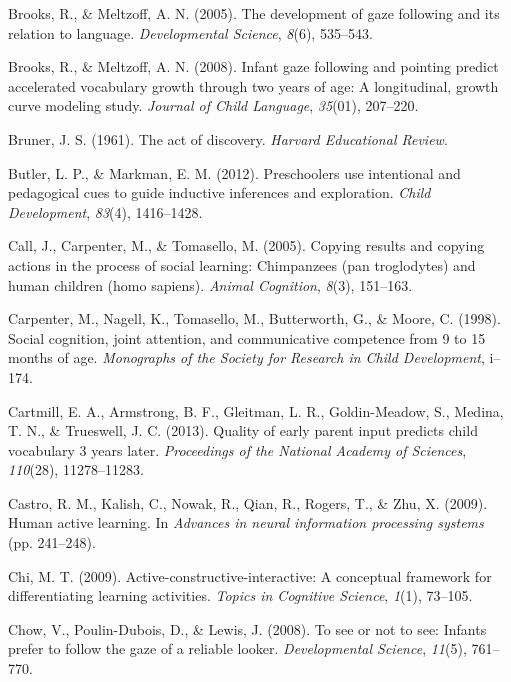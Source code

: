 \documentclass[oneside]{report}
\begin{document}
\hypertarget{ref-brooks2005development}{}
Brooks, R., \& Meltzoff, A. N. (2005). The development of gaze following
and its relation to language. \emph{Developmental Science}, \emph{8}(6),
535--543.

\hypertarget{ref-brooks2008infant}{}
Brooks, R., \& Meltzoff, A. N. (2008). Infant gaze following and
pointing predict accelerated vocabulary growth through two years of age:
A longitudinal, growth curve modeling study. \emph{Journal of Child
Language}, \emph{35}(01), 207--220.

\hypertarget{ref-bruner1961act}{}
Bruner, J. S. (1961). The act of discovery. \emph{Harvard Educational
Review}.

\hypertarget{ref-butler2012preschoolers}{}
Butler, L. P., \& Markman, E. M. (2012). Preschoolers use intentional
and pedagogical cues to guide inductive inferences and exploration.
\emph{Child Development}, \emph{83}(4), 1416--1428.

\hypertarget{ref-call2005copying}{}
Call, J., Carpenter, M., \& Tomasello, M. (2005). Copying results and
copying actions in the process of social learning: Chimpanzees (pan
troglodytes) and human children (homo sapiens). \emph{Animal Cognition},
\emph{8}(3), 151--163.

\hypertarget{ref-carpenter1998social}{}
Carpenter, M., Nagell, K., Tomasello, M., Butterworth, G., \& Moore, C.
(1998). Social cognition, joint attention, and communicative competence
from 9 to 15 months of age. \emph{Monographs of the Society for Research
in Child Development}, i--174.

\hypertarget{ref-cartmill2013quality}{}
Cartmill, E. A., Armstrong, B. F., Gleitman, L. R., Goldin-Meadow, S.,
Medina, T. N., \& Trueswell, J. C. (2013). Quality of early parent input
predicts child vocabulary 3 years later. \emph{Proceedings of the
National Academy of Sciences}, \emph{110}(28), 11278--11283.

\hypertarget{ref-castro2009human}{}
Castro, R. M., Kalish, C., Nowak, R., Qian, R., Rogers, T., \& Zhu, X.
(2009). Human active learning. In \emph{Advances in neural information
processing systems} (pp. 241--248).

\hypertarget{ref-chi2009active}{}
Chi, M. T. (2009). Active-constructive-interactive: A conceptual
framework for differentiating learning activities. \emph{Topics in
Cognitive Science}, \emph{1}(1), 73--105.

\hypertarget{ref-chow2008see}{}
Chow, V., Poulin-Dubois, D., \& Lewis, J. (2008). To see or not to see:
Infants prefer to follow the gaze of a reliable looker.
\emph{Developmental Science}, \emph{11}(5), 761--770.
\end{document}
